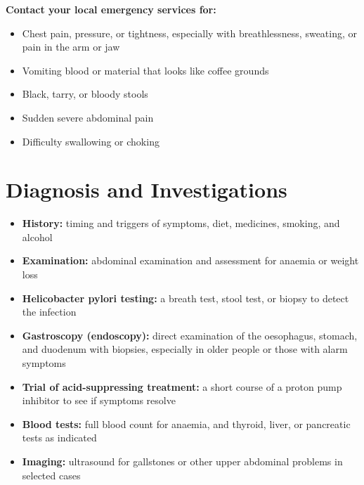 \textbf{Contact your local emergency services for:}
\begin{itemize}
    \item Chest pain, pressure, or tightness, especially with breathlessness, sweating, or pain in the arm or jaw
    \item Vomiting blood or material that looks like coffee grounds
    \item Black, tarry, or bloody stools
    \item Sudden severe abdominal pain
    \item Difficulty swallowing or choking
\end{itemize}

\section*{Diagnosis and Investigations}
\begin{itemize}
    \item \textbf{History:} timing and triggers of symptoms, diet, medicines, smoking, and alcohol
    \item \textbf{Examination:} abdominal examination and assessment for anaemia or weight loss
    \item \textbf{Helicobacter pylori testing:} a breath test, stool test, or biopsy to detect the infection
    \item \textbf{Gastroscopy (endoscopy):} direct examination of the oesophagus, stomach, and duodenum with biopsies, especially in older people or those with alarm symptoms
    \item \textbf{Trial of acid-suppressing treatment:} a short course of a proton pump inhibitor to see if symptoms resolve
    \item \textbf{Blood tests:} full blood count for anaemia, and thyroid, liver, or pancreatic tests as indicated
    \item \textbf{Imaging:} ultrasound for gallstones or other upper abdominal problems in selected cases
\end{itemize}

